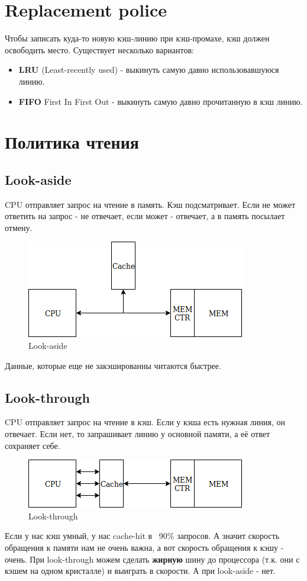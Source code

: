 \documentclass[12pt, a4paper]{article}
\begin{document}
\section{Replacement police}
Чтобы записать куда-то новую кэш-линию при кэш-промахе, кэш должен освободить место. Существует несколько вариантов:\\
\begin{itemize}
    \item \textbf{LRU} (Least-recently used) - выкинуть самую давно использовавшуюся линию.
    \item \textbf{FIFO} {First In First Out} - выкинуть самую давно прочитанную в кэш линию.
\end{itemize}
\section{Политика чтения}
\subsection{Look-aside}
CPU отправляет запрос на чтение в память. Кэш подсматривает. Если не может ответить на запрос - не отвечает, если может - отвечает, а в память посылает отмену.\\
\begin{figure}[h]
    \centering
    \includegraphics[scale=0.5]{images/LookAside.png}
    \caption{Look-aside}
    \label{fig:LookAside}
\end{figure}
Данные, которые еще не закэшированны читаются быстрее. 
\subsection{Look-through}
CPU отправляет запрос на чтение в кэш. Если у кэша есть нужная линия, он отвечает. Если нет, то запрашивает линию у основной памяти, а её ответ сохраняет себе.
\begin{figure}[h]
    \centering
    \includegraphics[scale=0.5]{images/LookThrough.png}
    \caption{Look-through}
    \label{fig:LookThrough}
\end{figure}
Если у нас кэш умный, у нас cache-hit в ~90\% запросов. А значит скорость обращения к памяти нам не очень важна, а вот скорость обращения к кэшу - очень. При look-through можем сделать \textbf{жирную} шину до процессора (т.к. они с кэшем на одном кристалле) и выиграть в скорости. А при look-aside - нет.
\end{document}
